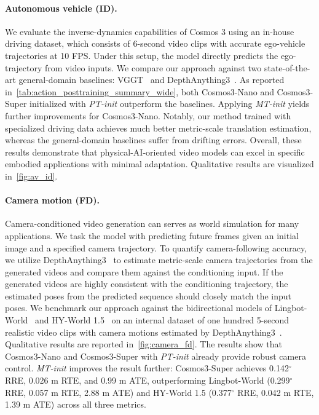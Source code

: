 

\paragraph{Autonomous vehicle (ID).} 
We evaluate the inverse-dynamics capabilities of Cosmos 3 using an in-house driving dataset, which consists of 6-second video clips with accurate ego-vehicle trajectories at 10 FPS. 
Under this setup, the model directly predicts the ego-trajectory from video inputs. 
We compare our approach against two state-of-the-art general-domain baselines: VGGT~\citep{wang2025vggt} and DepthAnything3~\citep{lin2025depthanything3}. 
As reported in~\cref{tab:action_posttraining_summary_wide}, both Cosmos3-Nano and Cosmos3-Super initialized with \textit{PT-init} outperform the baselines. 
Applying \textit{MT-init} yields further improvements for Cosmos3-Nano. 
Notably, our method trained with specialized driving data achieves much better metric-scale translation estimation, whereas the general-domain baselines suffer from drifting errors. 
Overall, these results demonstrate that physical-AI-oriented video models can excel in specific embodied applications with minimal adaptation. 
Qualitative results are visualized in~\cref{fig:av_id}.



\paragraph{Camera motion (FD).}
\label{sec:camera_fdm}
Camera-conditioned video generation can serves as world simulation for many applications. 
We task the model with predicting future frames given an initial image and a specified camera trajectory.
To quantify camera-following accuracy, we utilize DepthAnything3~\citep{lin2025depthanything3} to estimate metric-scale camera trajectories from the generated videos and compare them against the conditioning input.
If the generated videos are highly consistent with the conditioning trajectory, the estimated poses from the predicted sequence should closely match the input poses.
We benchmark our approach against the bidirectional models of Lingbot-World~\citep{lingbot-world} and HY-World 1.5~\citep{hyworld2025} on an internal dataset of one hundred 5-second realistic video clips with camera motions estimated by DepthAnything3~\citep{lin2025depthanything3}. Qualitative results are reported in~\cref{fig:camera_fd}. 
The results show that Cosmos3-Nano and Cosmos3-Super with \textit{PT-init} already provide robust camera control. 
\textit{MT-init} improves the result further: Cosmos3-Super achieves 0.142$^\circ$ RRE, 0.026 m RTE, and 0.99 m ATE, outperforming Lingbot-World (0.299$^\circ$ RRE, 0.057 m RTE, 2.88 m ATE) and HY-World 1.5 (0.377$^\circ$ RRE, 0.042 m RTE, 1.39 m ATE) across all three metrics.

